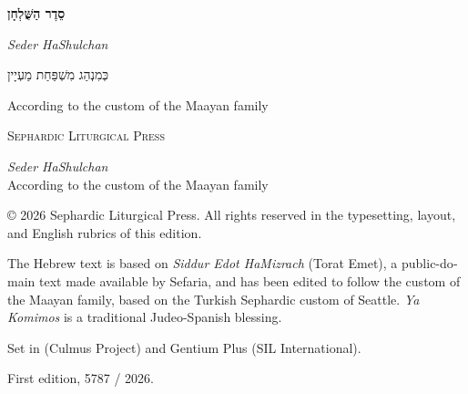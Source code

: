 
\thispagestyle{empty}
\vspace*{\fill}
\begin{center}
  {\LARGE\bfseries סֵדֶר הַשֻּׁלְחָן\par}
  \medskip
  \begin{otherlanguage}{english}
    {\large\itshape Seder HaShulchan\par}
  \end{otherlanguage}
  \bigskip
  {כְּמִנְהַג מִשְׁפַּחַת מַעְיָין\par}
  \smallskip
  \begin{otherlanguage}{english}
    {\small According to the custom of the Maayan family\par}
  \end{otherlanguage}
\end{center}
\vspace*{\fill}
\begin{center}
  \begin{otherlanguage}{english}
    {\small\scshape Sephardic Liturgical Press\par}
  \end{otherlanguage}
\end{center}
\clearpage

\thispagestyle{empty}
\begin{otherlanguage}{english}
\footnotesize\raggedright
\vspace*{\fill}

\textit{Seder HaShulchan}\\
According to the custom of the Maayan family

\medskip
© 2026 Sephardic Liturgical Press. All rights reserved in the typesetting,
layout, and English rubrics of this edition.

\medskip
The Hebrew text is based on \textit{Siddur Edot HaMizrach} (Torat Emet), a
public-domain text made available by Sefaria, and has been edited to follow
the custom of the Maayan family, based on the Turkish Sephardic custom of
Seattle. \textit{Ya Komimos} is a traditional
Judeo-Spanish blessing.

\medskip
Set in \pressHebrewFontName{} (Culmus Project) and Gentium Plus
(SIL International).

\medskip
First edition, 5787 / 2026.

\vspace*{\fill}
\end{otherlanguage}

